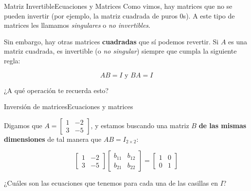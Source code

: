 \documentclass[spanish, c]{beamer}
\begin{document}
\begin{frame}{Matriz Invertible}{Ecuaciones y Matrices}
    Como vimos, hay matrices que no se pueden invertir (por ejemplo, la matriz cuadrada de puros 0s). A este tipo de matrices les llamamos \textit{singulares} o \textit{no invertibles}. \pause

    \bigskip

    Sin embargo, hay otras matrices \textbf{cuadradas} que sí podemos revertir. Si $A$ es una matriz cuadrada, es \alert{invertible} (o \textit{no singular}) siempre que cumpla la siguiente regla: \pause

    \bigskip

    \[AB = I \text{ y } BA = I\]

    \bigskip

    ¿A qué operación te recuerda esto?  

\end{frame}

\begin{frame}{Inversión de matrices}{Ecuaciones y matrices}

    Digamos que $A = \begin{bmatrix*}
        1 & -2 \\ 3 & -5
    \end{bmatrix*}$, y estamos buscando una matriz $B$ \textbf{de las mismas dimensiones} de tal manera que $AB = I_{2 \times 2}$: \pause

    \bigskip

    \[
        \begin{bmatrix*}
            1 & -2 \\
            3 & -5
        \end{bmatrix*}
        \begin{bmatrix*}
            b_{11} & b_{12} \\
            b_{21} & b_{22}
        \end{bmatrix*} =
        \begin{bmatrix*}
            1 & 0 \\ 0 & 1
        \end{bmatrix*}
    \] \pause

    \bigskip

    ¿Cuáles son las ecuaciones que tenemos para cada una de las casillas en $I$?
\end{frame}
\end{document}
